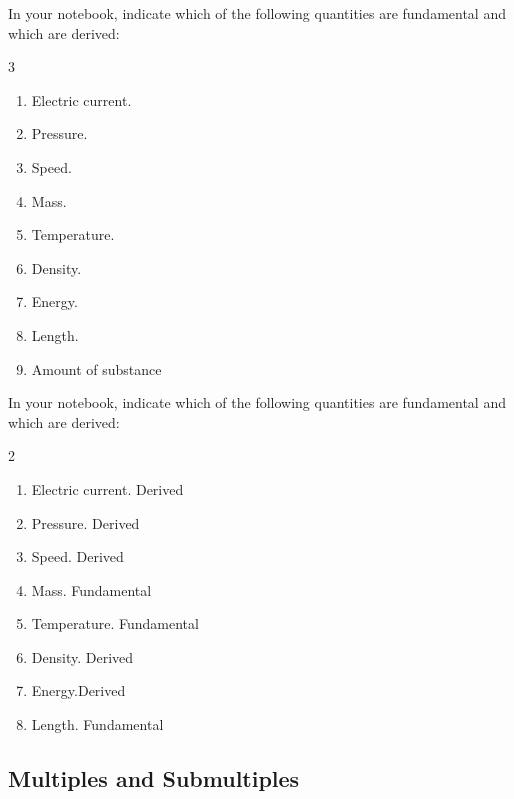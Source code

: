 \begin{exercise}
    In your notebook, indicate which of the following quantities are fundamental and which are derived:
    \vspace*{-12pt}
    \begin{multicols}{3}
        \begin{enumerate}[label=\letraminuscula]
            \item Electric current.
            \item Pressure.
            \item Speed.
            \item Mass.
            \item Temperature.
            \item Density.
            \item Energy.
            \item Length.
            \item Amount of substance
        \end{enumerate}
    \end{multicols}
    \begin{solu}
        In your notebook, indicate which of the following quantities are fundamental and which are derived:
        \begin{multicols}{2}
            \begin{enumerate}[label=\letraminuscula]
            \item Electric current. \textcolor{ocre}{Derived}
            \item Pressure. \textcolor{ocre}{Derived}
            \item Speed. \textcolor{ocre}{Derived}
            \item Mass. \textcolor{ocre}{Fundamental}
            \item Temperature. \textcolor{ocre}{Fundamental}
            \item Density. \textcolor{ocre}{Derived}
            \item Energy.\textcolor{ocre}{Derived}
            \item Length. \textcolor{ocre}{Fundamental}
            \end{enumerate}
        \end{multicols}
    \end{solu}
\end{exercise}

\subsection{Multiples and Submultiples}

